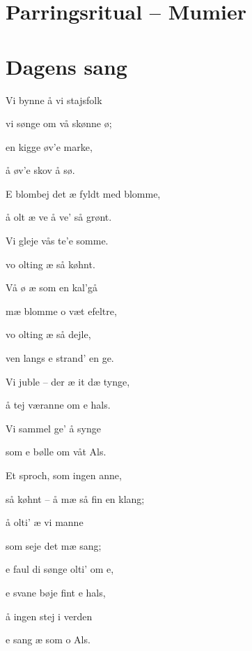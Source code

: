 \begin{minipage}[t]{100mm}
\vspace{3mm}

\section*{Parringsritual -- Mumier}


\section*{Dagens sang}
\begin{center}
Vi bynne å vi stajsfolk

vi sønge om vå skønne ø;

en kigge øv’e marke,

å øv’e skov å sø.

E blombej det æ fyldt med blomme,

å olt æ ve å ve’ så grønt.

Vi gleje vås te’e somme.

vo olting æ så køhnt.

Vå ø æ som en kal’gå

mæ blomme o væt efeltre,

vo olting æ så dejle,

ven langs e strand’ en ge.

Vi juble – der æ it dæ tynge,

å tej væranne om e hals.

Vi sammel ge’ å synge

som e bølle om våt Als.

Et sproch, som ingen anne,

så køhnt – å mæ så fin en klang;

å olti’ æ vi manne

som seje det mæ sang;

e faul di sønge olti’ om e,

e svane bøje fint e hals,

å ingen stej i verden

e sang æ som o Als.
\end{center}
\end{minipage}
